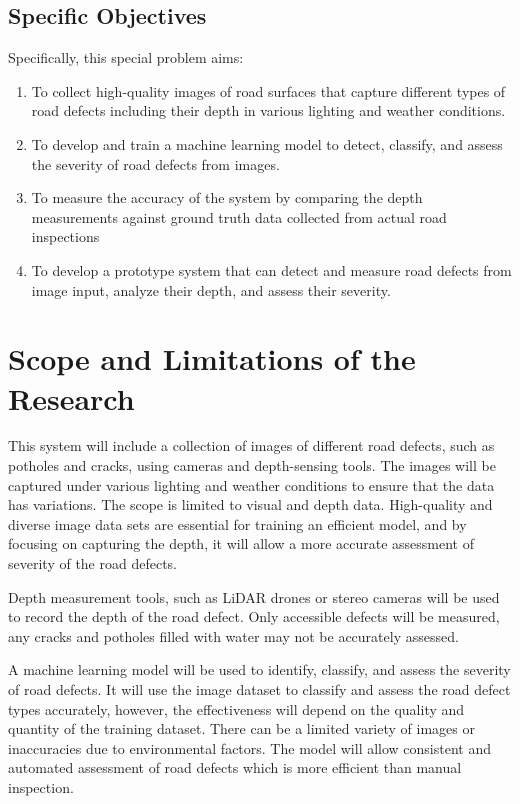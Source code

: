 \documentclass{report} %
\begin{document}
	
	
	\subsection{Specific Objectives}
	\label{sec:specificobjectives}
	
	Specifically, this special problem aims:
	\begin{enumerate}
		\item To collect high-quality images of road surfaces that capture different types of road defects including their depth in various lighting and weather conditions.
		\item To develop and train a machine learning model to detect, classify, and assess the severity of road defects from images. 
		\item To measure the accuracy of the system by comparing the depth measurements against ground truth data collected from actual road inspections
		\item To develop a prototype system that can detect and measure road defects from image input, analyze their depth, and assess their severity.
	\end{enumerate}
	
	
	\section{Scope and Limitations of the Research}
	\label{sec:scopelimitations}
	
	
	
	This system will include a collection of images of  different road defects, such as potholes and cracks, using cameras and depth-sensing tools. The images will be captured under various lighting and weather conditions to ensure that the data has variations. The scope is limited to visual and depth data. High-quality and diverse  image data sets are essential for training an efficient model, and by focusing on capturing the depth, it will allow a more accurate assessment of severity of the road defects. 
	
	
	Depth measurement tools, such as LiDAR drones or stereo cameras will be used to record the depth of the road defect. Only accessible defects will be measured, any cracks and potholes filled with water may not be accurately assessed. 
	
	
	A machine learning model will be used to identify, classify, and assess the severity of road defects. It will use the image dataset to classify and assess the road defect types accurately, however, the effectiveness will depend on the quality and quantity of the training dataset. There can be a limited variety of images or inaccuracies due to environmental factors. The model will allow consistent and automated assessment of road defects which is more efficient than manual inspection. 
	
\end{document}
